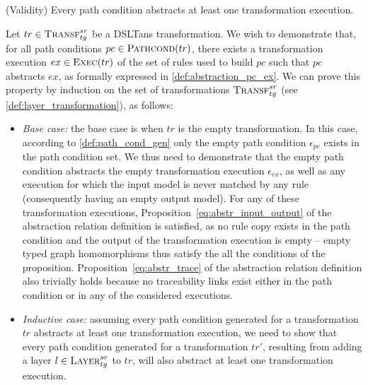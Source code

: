 \begin{proposition}{(Validity)}
\label{prop:pc_validity}
Every path condition abstracts at least one transformation execution.
\end{proposition}
\begin{ps}

Let $tr\in \textsc{Transf}^{sr}_{tg}$ be a DSLTans transformation. We wish to demonstrate that, for all path conditions $pc\in \textsc{Pathcond}(tr)$, there exists a transformation execution $ex\in \textsc{Exec}(tr)$ of the set of
rules used to build $pc$ such that $pc$ abstracts $ex$, as formally expressed in \cref{def:abstraction_pc_ex}. We can prove this property by induction on the set of transformations $\textsc{Transf}^{sr}_{tg}$ (see \cref{def:layer_transformation}), as follows:

\begin{itemize}
  \item \emph{Base case:} the base case is when $tr$ is the empty
  transformation. In this case, according to \cref{def:path_cond_gen} only the
  empty path condition $\epsilon_{pc}$ exists in the path condition set. We thus
  need to demonstrate that the empty path condition abstracts the empty
  transformation execution $\epsilon_{ex}$, as well as any execution for which
  the input model is never matched by any rule (consequently having an empty
  output model). For any of these transformation executions, Proposition~\ref{eq:abstr_input_output} of the abstraction relation definition is satisfied, as no rule copy exists in the path condition and the output of the transformation execution is empty -- empty typed graph homomorphisms thus satisfy the all the conditions of the proposition. Proposition~\ref{eq:abstr_trace} of the abstraction relation definition also trivially holds because no traceability links exist either in the path condition or in any of the considered executions.
  
 
\item \emph{Inductive case:} assuming every path condition generated for a transformation $tr$ abstracts at least one transformation execution, we need to show that every path condition generated for a transformation $tr'$, resulting from adding a layer $l\in \textsc{Layer}^{sr}_{tg}$ to $tr$, will also abstract at least one transformation execution. 
\end{itemize}


\end{ps}
